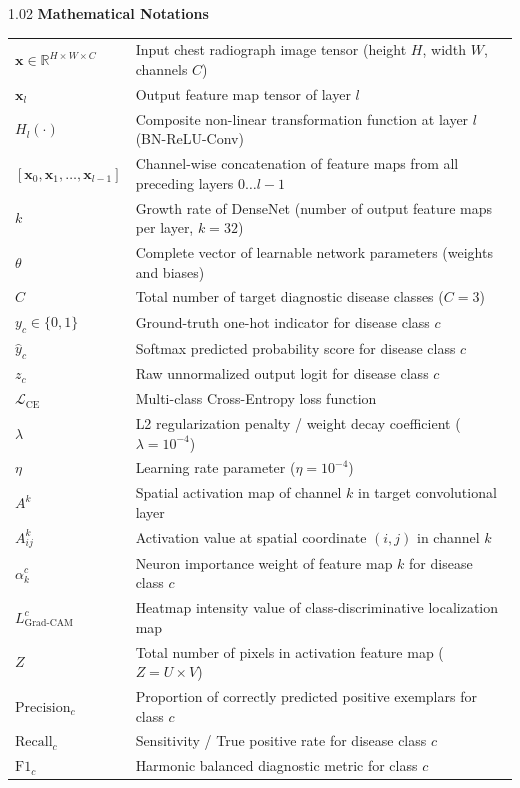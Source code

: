 \begin{spacing}{1.02}
\vspace{6pt}
\noindent \textbf{Mathematical Notations}
\nopagebreak[4]
\vspace{4pt}
\nopagebreak[4]

\noindent\begin{tabular*}{\textwidth}{@{\extracolsep{\fill}}p{2.8cm} p{11.2cm}@{}}
$\mathbf{x} \in \mathbb{R}^{H \times W \times C}$ & Input chest radiograph image tensor (height $H$, width $W$, channels $C$) \\
$\mathbf{x}_l$ & Output feature map tensor of layer $l$ \\
$H_l(\cdot)$ & Composite non-linear transformation function at layer $l$ (BN-ReLU-Conv) \\
$[\mathbf{x}_0, \mathbf{x}_1, \dots, \mathbf{x}_{l-1}]$ & Channel-wise concatenation of feature maps from all preceding layers $0 \dots l-1$ \\
$k$ & Growth rate of DenseNet (number of output feature maps per layer, $k=32$) \\
$\theta$ & Complete vector of learnable network parameters (weights and biases) \\
$C$ & Total number of target diagnostic disease classes ($C=3$) \\
$y_c \in \{0, 1\}$ & Ground-truth one-hot indicator for disease class $c$ \\
$\hat{y}_c$ & Softmax predicted probability score for disease class $c$ \\
$z_c$ & Raw unnormalized output logit for disease class $c$ \\
$\mathcal{L}_{\text{CE}}$ & Multi-class Cross-Entropy loss function \\
$\lambda$ & L2 regularization penalty / weight decay coefficient ($\lambda = 10^{-4}$) \\
$\eta$ & Learning rate parameter ($\eta = 10^{-4}$) \\
$A^k$ & Spatial activation map of channel $k$ in target convolutional layer \\
$A_{ij}^k$ & Activation value at spatial coordinate $(i, j)$ in channel $k$ \\
$\alpha_k^c$ & Neuron importance weight of feature map $k$ for disease class $c$ \\
$L_{\text{Grad-CAM}}^c$ & Heatmap intensity value of class-discriminative localization map \\
$Z$ & Total number of pixels in activation feature map ($Z = U \times V$) \\
$\text{Precision}_c$ & Proportion of correctly predicted positive exemplars for class $c$ \\
$\text{Recall}_c$ & Sensitivity / True positive rate for disease class $c$ \\
$\text{F1}_c$ & Harmonic balanced diagnostic metric for class $c$ \\
\end{tabular*}
\end{spacing}

\thispagestyle{plain}
